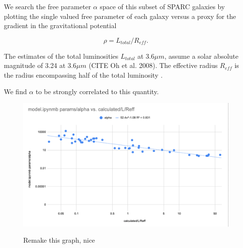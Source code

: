 \documentclass[reprint,%
 amsmath,amssymb,
 aps,
]{revtex4-1}
\begin{document}


  We search the free parameter $\alpha$ space of this subset of SPARC galaxies by plotting the single valued free parameter of each galaxy   versus a proxy for the gradient in the gravitational potential
  
   \begin{equation}
     \rho = L_{total}/R_{eff}.
 \end{equation}
 
 The  estimates of the  total luminosities $L_{total}$ at $3.6 \mu m$,  assume a solar
absolute magnitude of 3.24 at $3.6 \mu m$ (CITE Oh et al. 2008). The effective radius $R_{eff}$ is    the radius encompassing half of the total luminosity \citet{2016Lelli}.  
 

 We find $\alpha$  to be   strongly correlated to  this quantity. 
  
 \begin{figure}[h]
\scalebox{0.5}%
{\includegraphics{alpha_10_18_22.png} }
\caption{ Remake this graph, nice   }
\label{alpha2}
\end{figure}  
 
\end{document}

